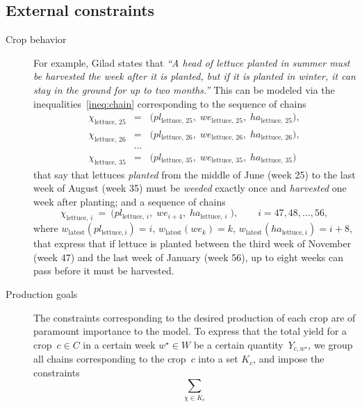 \documentclass[11pt,reqno]{amsart}
\numberwithin{equation}{section}
\begin{document}
\subsection{External constraints}

\begin{description}
\item[Crop behavior] For example, Gilad states that \emph{``A head of lettuce planted in
  summer must be harvested the week after it is planted, but if it is planted in winter,
  it can stay in the ground for up to two months.''} This can be modeled via the
  inequalities~\eqref{ineq:chain} corresponding to the sequence of chains
\begin{eqnarray*}
   \chi_{\text{lettuce},\, 25} 
   &=& 
   \big(
      pl_{\text{lettuce},\, 25}, \; 
      we_{\text{lettuce},\, 25}, \;
      ha_{\text{lettuce},\, 25}
      \big), \\
   \chi_{\text{lettuce},\, 26} 
   &=& 
   \big(
      pl_{\text{lettuce},\, 26}, \; 
      we_{\text{lettuce},\, 26}, \;
      ha_{\text{lettuce},\, 26}
      \big), \\
   &\dots& \\
   \chi_{\text{lettuce},\, 35} 
   &=& 
   \big(
      pl_{\text{lettuce},\, 35}, \; 
      we_{\text{lettuce},\, 35}, \;
      ha_{\text{lettuce},\, 35}
      \big)
\end{eqnarray*}
that say that lettuces \emph{planted} from the middle of June (week 25) to the last week
of August (week 35) must be \emph{weeded} exactly once and \emph{harvested} one week after
planting; and a sequence of chains
\[
    \chi_{\text{lettuce},\, i} 
   \ = \ 
   \big(
      pl_{\text{lettuce},\, i}, \; 
      we_{i+4}, \;
      ha_{\text{lettuce},\, i} \;
      \big),
      \qquad i=47,48,\dots, 56,
\]
where $w_{\text{latest}}(pl_{\text{lettuce},i})=i$, $w_{\text{latest}}(we_k)=k$,
$w_{\text{latest}}(ha_{\text{lettuce},i})=i+8$, that express that if lettuce is planted
between the third week of November (week 47) and the last week of January (week 56), up to
eight weeks can pass before it must be harvested.

\item[Production goals] The constraints corresponding to the desired production of each
  crop are of paramount importance to the model. To express that the total yield for a
  crop~$c\in C$ in a certain week $w^\star\in W$ be a certain quantity~$Y_{c,w^\star}$, we
  group all chains corresponding to the crop~$c$ into a set $K_c$, and impose the
  constraints
  \[
     \sum_{\chi\in K_c} 
  \]


\end{description}
\end{document}
